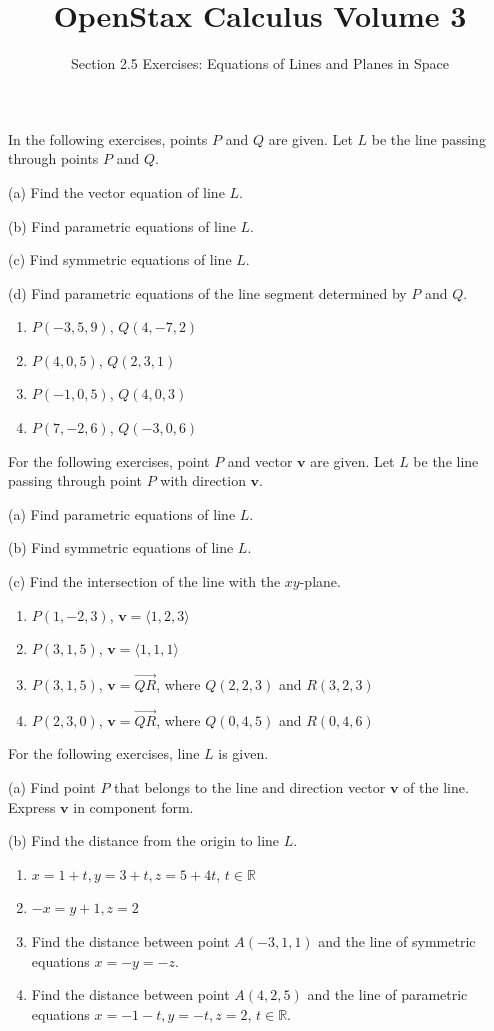 \documentclass{exercises}
\title{OpenStax Calculus Volume 3}
\subtitle{Section 2.5 Exercises: Equations of Lines and Planes in Space}
\author{}
\date{}
\begin{document}
\maketitle


In the following exercises, points $P$ and $Q$ are given. Let $L$ be the line passing through points $P$ and $Q$.


(a) Find the vector equation of line $L$.


(b) Find parametric equations of line $L$.


(c) Find symmetric equations of line $L$.


(d) Find parametric equations of the line segment determined by $P$ and $Q$.

\begin{enumerate}[start=1]
\item $P(-3,5,9)$, $Q(4,-7,2)$
\item $P(4,0,5)$, $Q(2,3,1)$
\item $P(-1,0,5)$, $Q(4,0,3)$
\item $P(7,-2,6)$, $Q(-3,0,6)$
\end{enumerate}

For the following exercises, point $P$ and vector $\mathbf{v}$ are given. Let $L$ be the line passing through point $P$ with direction $\mathbf{v}$.


(a) Find parametric equations of line $L$.


(b) Find symmetric equations of line $L$.


(c) Find the intersection of the line with the $xy$-plane.

\begin{enumerate}[resume]
\item $P(1,-2,3)$, $\mathbf{v}=\langle1,2,3\rangle$
\item $P(3,1,5)$, $\mathbf{v}=\langle1,1,1\rangle$
\item $P(3,1,5)$, $\mathbf{v}=\overset{\to}{QR}$, where $Q(2,2,3)$ and $R(3,2,3)$
\item $P(2,3,0)$, $\mathbf{v}=\overset{\to}{QR}$, where $Q(0,4,5)$ and $R(0,4,6)$
\end{enumerate}

For the following exercises, line $L$ is given.


(a) Find point $P$ that belongs to the line and direction vector $\mathbf{v}$ of the line. Express $\mathbf{v}$ in component form.


(b) Find the distance from the origin to line $L$.

\begin{enumerate}[resume]
\item $x=1+t,y=3+t,z=5+4t$, $t\in \mathbb{R}$
\item $-x=y+1,z=2$
\item Find the distance between point $A(-3,1,1)$ and the line of symmetric equations $x=-y=-z$.
\item Find the distance between point $A(4,2,5)$ and the line of parametric equations $x=-1-t,y=-t,z=2$, $t\in \mathbb{R}$.
\end{enumerate}
\end{document}
